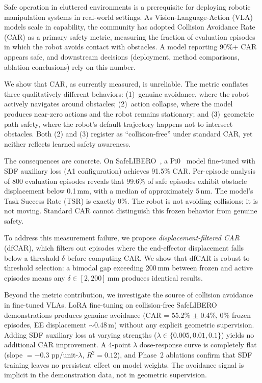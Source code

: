 \documentclass[10pt,letterpaper]{article}
\begin{document}
Safe operation in cluttered environments is a prerequisite for deploying robotic manipulation systems in real-world settings. As Vision-Language-Action (VLA) models scale in capability, the community has adopted Collision Avoidance Rate (CAR) as a primary safety metric, measuring the fraction of evaluation episodes in which the robot avoids contact with obstacles. A model reporting 90\%+ CAR appears safe, and downstream decisions (deployment, method comparisons, ablation conclusions) rely on this number.

We show that CAR, as currently measured, is unreliable. The metric conflates three qualitatively different behaviors: (1)~genuine avoidance, where the robot actively navigates around obstacles; (2)~action collapse, where the model produces near-zero actions and the robot remains stationary; and (3)~geometric path safety, where the robot's default trajectory happens not to intersect obstacles. Both (2) and (3) register as ``collision-free'' under standard CAR, yet neither reflects learned safety awareness.

The consequences are concrete. On SafeLIBERO~\cite{safelibero2025}, a Pi0~\cite{pi02024} model fine-tuned with SDF auxiliary loss (A1 configuration) achieves 91.5\% CAR. Per-episode analysis of 800 evaluation episodes reveals that 99.6\% of safe episodes exhibit obstacle displacement below 0.1\,mm, with a median of approximately 5\,nm. The model's Task Success Rate (TSR) is exactly 0\%. The robot is not avoiding collisions; it is not moving. Standard CAR cannot distinguish this frozen behavior from genuine safety.

To address this measurement failure, we propose \emph{displacement-filtered CAR} (dfCAR), which filters out episodes where the end-effector displacement falls below a threshold $\delta$ before computing CAR. We show that dfCAR is robust to threshold selection: a bimodal gap exceeding 200\,mm between frozen and active episodes means any $\delta \in [2, 200]$\,mm produces identical results.

Beyond the metric contribution, we investigate the source of collision avoidance in fine-tuned VLAs. LoRA fine-tuning on collision-free SafeLIBERO demonstrations produces genuine avoidance (CAR = 55.2\% $\pm$ 0.4\%, 0\% frozen episodes, EE displacement $\sim$0.48\,m) without any explicit geometric supervision. Adding SDF auxiliary loss at varying strengths ($\lambda \in \{0.005, 0.01, 0.1\}$) yields no additional CAR improvement. A 4-point $\lambda$ dose-response curve is completely flat (slope $= -0.3$ pp/unit-$\lambda$, $R^2 = 0.12$), and Phase~2 ablations confirm that SDF training leaves no persistent effect on model weights. The avoidance signal is implicit in the demonstration data, not in geometric supervision.
\end{document}
